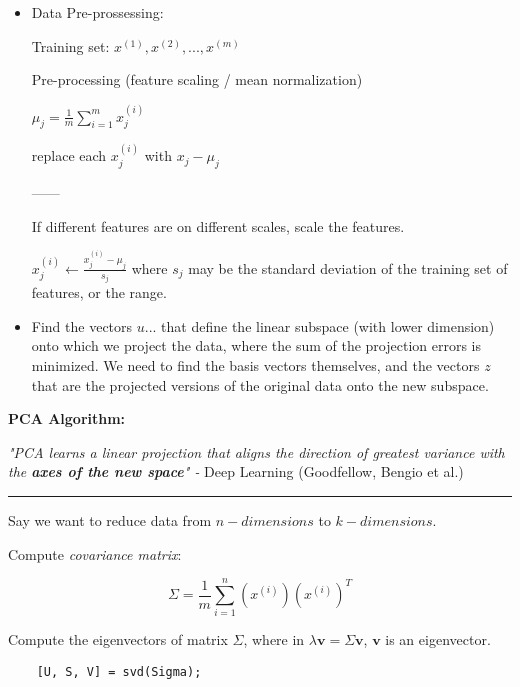 \documentclass{article}
\begin{document}
\begin{itemize}
    \item Data Pre-prossessing:
    
    Training set: $x^{(1)}, x^{(2)}, ..., x^{(m)}$
    
    Pre-processing (feature scaling / mean normalization)
    
    $\mu_j = \frac{1}{m} \sum_{i=1}^m x_j^{(i)}$
    
    replace each $x_j^{(i)}$ with $x_j - \mu_j$
    
    
    ------
    
    If different features are on different scales, scale the features. 
    
    $ x_j^{(i)} \longleftarrow \frac{x_j^{(i)} - \mu_j}{s_j}$ where $s_j$ may be the standard deviation of the training set of features, or the range. 
    
    
    
    \item Find the vectors $u ...$ that define the linear subspace (with lower dimension) onto which we project the data, where the sum of the projection errors is minimized. We need to find the basis vectors themselves, and the vectors $z$ that are the projected versions of the original data onto the new subspace.
    
    
    
\end{itemize}




\textbf{PCA Algorithm:}

\textit{"PCA learns a linear projection that aligns the direction of greatest variance with the {\textbf{axes of the new space}}" - } Deep Learning (Goodfellow, Bengio et al.)


\par\noindent\rule{\textwidth}{0.2pt}

Say we want to reduce data from $n-dimensions$ to $k-dimensions$.

Compute \textit{covariance matrix}:

\begin{equation}
    \Sigma = \frac{1}{m} \sum_{i=1}^{n} (x^{(i)})(x^{(i)})^T
\end{equation}



Compute the eigenvectors of matrix $\Sigma$, where in $\lambda \textbf{v} = \Sigma \textbf{v}$, $\textbf{v}$ is an eigenvector.

\begin{verbatim}
    [U, S, V] = svd(Sigma);
\end{verbatim}
\end{document}
